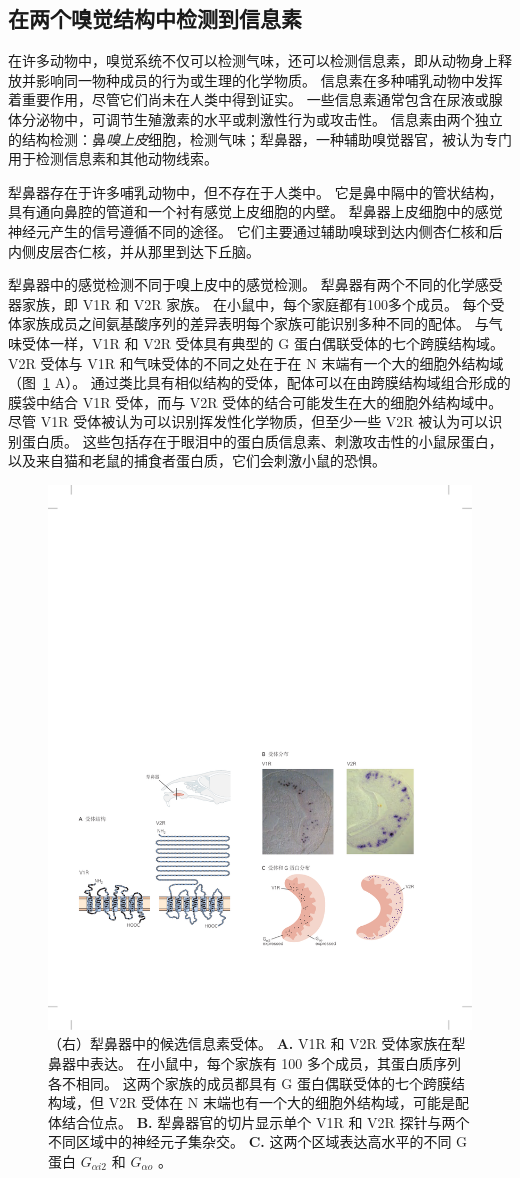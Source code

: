 \subsection{在两个嗅觉结构中检测到信息素}

在许多动物中，嗅觉系统不仅可以检测气味，还可以检测信息素，即从动物身上释放并影响同一物种成员的行为或生理的化学物质。
信息素在多种哺乳动物中发挥着重要作用，尽管它们尚未在人类中得到证实。
一些信息素通常包含在尿液或腺体分泌物中，可调节生殖激素的水平或刺激性行为或攻击性。
信息素由两个独立的结构检测：鼻\textit{嗅上皮}细胞，检测气味；犁鼻器，一种辅助嗅觉器官，被认为专门用于检测信息素和其他动物线索。


犁鼻器存在于许多哺乳动物中，但不存在于人类中。
它是鼻中隔中的管状结构，具有通向鼻腔的管道和一个衬有感觉上皮细胞的内壁。
犁鼻器上皮细胞中的感觉神经元产生的信号遵循不同的途径。
它们主要通过辅助嗅球到达内侧杏仁核和后内侧皮层杏仁核，并从那里到达下丘脑。


犁鼻器中的感觉检测不同于嗅上皮中的感觉检测。
犁鼻器有两个不同的化学感受器家族，即 V1R 和 V2R 家族。
在小鼠中，每个家庭都有100多个成员。
每个受体家族成员之间氨基酸序列的差异表明每个家族可能识别多种不同的配体。
与气味受体一样，V1R 和 V2R 受体具有典型的 G 蛋白偶联受体的七个跨膜结构域。 
V2R 受体与 V1R 和气味受体的不同之处在于在 N 末端有一个大的细胞外结构域（图~\ref{fig:29_9} A）。
通过类比具有相似结构的受体，配体可以在由跨膜结构域组合形成的膜袋中结合 V1R 受体，而与 V2R 受体的结合可能发生在大的细胞外结构域中。
尽管 V1R 受体被认为可以识别挥发性化学物质，但至少一些 V2R 被认为可以识别蛋白质。
这些包括存在于眼泪中的蛋白质信息素、刺激攻击性的小鼠尿蛋白，以及来自猫和老鼠的捕食者蛋白质，它们会刺激小鼠的恐惧。


\begin{figure}[htbp]
	\centering
	\includegraphics[width=0.5\linewidth]{chap29/fig_29_9}
	\caption{（右）犁鼻器中的候选信息素受体。
		\textbf{A.} V1R 和 V2R 受体家族在犁鼻器中表达。
		在小鼠中，每个家族有 100 多个成员，其蛋白质序列各不相同。
		这两个家族的成员都具有 G 蛋白偶联受体的七个跨膜结构域，但 V2R 受体在 N 末端也有一个大的细胞外结构域，可能是配体结合位点。
		\textbf{B.} 犁鼻器官的切片显示单个 V1R 和 V2R 探针与两个不同区域中的神经元子集杂交。 
		\textbf{C.} 这两个区域表达高水平的不同 G 蛋白 $ G_{\alpha i 2} $ 和 $ G_{\alpha o}$ 。}
	\label{fig:29_9}
\end{figure}


